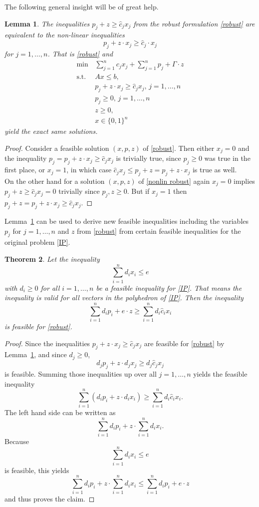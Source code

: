 \documentclass[titlepage, a4paper]{amsbook}
\theoremstyle{plain}
\newtheorem{thm}{Theorem}[chapter]
\newtheorem{lem}[thm]{Lemma}
\theoremstyle{break}
\theoremstyle{definition}
\theoremstyle{remark}
\numberwithin{equation}{thm}
\begin{document}
The following general insight will be of great help.
\begin{lem}\label{nonlinear inequalities}
The inequalities $p_j + z \geq \hat{c}_jx_j$ from the robust formulation \eqref{robust} are equivalent to the non-linear inequalities
\[p_j + z \cdot x_j \geq \hat{c}_j \cdot x_j\]
for $j=1, \ldots, n$. That is \eqref{robust} and 
\begin{equation}\label{nonlin robust}
\begin{split}
    \min\, &\sum_{j=1}^{n} c_j x_j + \sum_{j=1}^{n}p_j + \Gamma \cdot z\\
    \text{s.t. } &Ax \leq b, \\
    &p_j+ z \cdot x_j \geq \hat{c}_jx_j, \, j=1, \ldots,n\\
  &p_j \geq 0, \, j=1, \ldots, n \\
  &z \geq 0, \\
    &x \in \{0,1\}^n
\end{split}
\end{equation}
yield the exact same solutions.
\end{lem}
\begin{proof}
Consider a feasible solution $(x,p,z)$ of \eqref{robust}. Then either $x_j=0$ and the inequality $p_j=p_j + z \cdot x_j \geq \hat{c}_j x_j$ is trivially true, since $p_j \geq 0$ was true in the first place, or $x_j=1$, in which case $\hat{c}_j x_j \leq p_j + z = p_j + z \cdot x_j$ is true as well. \\
On the other hand for a solution $(x,p,z)$ of \eqref{nonlin robust} again $x_j=0$ implies $p_j +z \geq \hat{c}_j x_j=0$ trivially since $p_j,z \geq 0$. But if $x_j=1$ then $p_j + z=p_j + z \cdot x_j \geq \hat{c}_j x_j$.
\end{proof}
Lemma~\ref{nonlinear inequalities} can be used to derive new feasible inequalities including the variables $p_j$ for $j=1, \ldots, n$ and $z$ from \eqref{robust} from certain feasible inequalities for the original problem \ref{IP}.
\begin{thm}\label{thm: use inequalities for robust}
Let the inequality 
\[\sum_{i=1}^{n}d_i x_i \leq e\]
with $d_i \geq 0$ for all $i=1, \ldots,n$ be a feasible inequality for \eqref{IP}. That means the inequality is valid for all vectors in the polyhedron of \eqref{IP}.
Then the inequality
\[\sum_{i=1}^{n}d_i p_i + e \cdot z \geq \sum_{i=1}^{n}d_i \hat{c}_i x_i\]
is feasible for \eqref{robust}.
\end{thm}
\begin{proof}
Since the inequalities $p_j + z \cdot x_j \geq \hat{c}_j x_j$ are feasible for \eqref{robust} by Lemma~\ref{nonlinear inequalities}, and since $d_j \geq 0$, 
\[d_j p_j +  z \cdot d_j x_j \geq d_j \hat{c}_j x_j\]
is feasible.
Summing those inequalities up over all $j=1, \ldots, n$
yields the feasible inequality
\[\sum_{i=1}^{n}(d_i p_i +  z \cdot d_i x_i) \geq \sum_{i=1}^{n}d_i \hat{c}_i x_i.\]
The left hand side can be written as 
\[\sum_{i=1}^{n}d_i p_i + z \cdot \sum_{i=1}^{n}d_i x_i.\]
Because 
\[\sum_{i=1}^{n}d_i x_i \leq e\]
is feasible, this yields
\[\sum_{i=1}^{n}d_i p_i + z \cdot \sum_{i=1}^{n}d_i x_i \leq \sum_{i=1}^{n}d_i p_i +e \cdot z\]
and thus proves the claim.
\end{proof}
\end{document}
